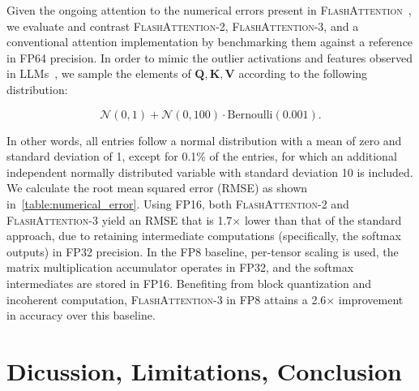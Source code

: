 Given the ongoing attention to the numerical errors present in \textsc{FlashAttention}~\citep{golden2024flash}, we evaluate and contrast \textsc{FlashAttention-2}, \textsc{FlashAttention-3}, and a conventional attention implementation by benchmarking them against a reference in FP64 precision. In order to mimic the outlier activations and features observed in LLMs~\citep{dettmers2208llm, sun2024massive}, we sample the elements of $\mathbf{Q}, \mathbf{K}, \mathbf{V}$ according to the following distribution:

\begin{equation*}
  \mathcal{N}(0, 1) + \mathcal{N}(0, 100) \cdot \mathrm{Bernoulli}(0.001).
\end{equation*}

In other words, all entries follow a normal distribution with a mean of zero and standard deviation of 1, except for 0.1\% of the entries, for which an additional independent normally distributed variable with standard deviation 10 is included. We calculate the root mean squared error (RMSE) as shown in~\cref{table:numerical_error}. Using FP16, both \textsc{FlashAttention-2} and \textsc{FlashAttention-3} yield an RMSE that is 1.7$\times$ lower than that of the standard approach, due to retaining intermediate computations (specifically, the softmax outputs) in FP32 precision. In the FP8 baseline, per-tensor scaling is used, the matrix multiplication accumulator operates in FP32, and the softmax intermediates are stored in FP16. Benefiting from block quantization and incoherent computation, \textsc{FlashAttention-3} in FP8 attains a 2.6$\times$ improvement in accuracy over this baseline.

\section{Dicussion, Limitations, Conclusion}
\label{sec:discussion}

